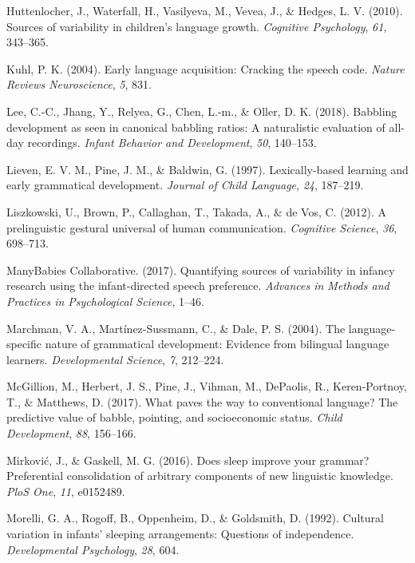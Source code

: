 \documentclass[,man,floatsintext]{apa6}
\begin{document}
\hypertarget{ref-huttenlocher2010sources}{}
Huttenlocher, J., Waterfall, H., Vasilyeva, M., Vevea, J., \& Hedges, L.
V. (2010). Sources of variability in children's language growth.
\emph{Cognitive Psychology}, \emph{61}, 343--365.

\hypertarget{ref-kuhl2004early}{}
Kuhl, P. K. (2004). Early language acquisition: Cracking the speech
code. \emph{Nature Reviews Neuroscience}, \emph{5}, 831.

\hypertarget{ref-lee2018babbling}{}
Lee, C.-C., Jhang, Y., Relyea, G., Chen, L.-m., \& Oller, D. K. (2018).
Babbling development as seen in canonical babbling ratios: A
naturalistic evaluation of all-day recordings. \emph{Infant Behavior and
Development}, \emph{50}, 140--153.

\hypertarget{ref-lieven1997lexically}{}
Lieven, E. V. M., Pine, J. M., \& Baldwin, G. (1997). Lexically-based
learning and early grammatical development. \emph{Journal of Child
Language}, \emph{24}, 187--219.

\hypertarget{ref-liszkowski2012prelinguistic}{}
Liszkowski, U., Brown, P., Callaghan, T., Takada, A., \& de Vos, C.
(2012). A prelinguistic gestural universal of human communication.
\emph{Cognitive Science}, \emph{36}, 698--713.

\hypertarget{ref-manybabies2017}{}
ManyBabies Collaborative. (2017). Quantifying sources of variability in
infancy research using the infant-directed speech preference.
\emph{Advances in Methods and Practices in Psychological Science},
1--46.

\hypertarget{ref-marchman2004language}{}
Marchman, V. A., Martínez-Sussmann, C., \& Dale, P. S. (2004). The
language-specific nature of grammatical development: Evidence from
bilingual language learners. \emph{Developmental Science}, \emph{7},
212--224.

\hypertarget{ref-mcgillion2017paves}{}
McGillion, M., Herbert, J. S., Pine, J., Vihman, M., DePaolis, R.,
Keren-Portnoy, T., \& Matthews, D. (2017). What paves the way to
conventional language? The predictive value of babble, pointing, and
socioeconomic status. \emph{Child Development}, \emph{88}, 156--166.

\hypertarget{ref-mirkovic2016does}{}
Mirković, J., \& Gaskell, M. G. (2016). Does sleep improve your grammar?
Preferential consolidation of arbitrary components of new linguistic
knowledge. \emph{PloS One}, \emph{11}, e0152489.

\hypertarget{ref-morelli1992cultural}{}
Morelli, G. A., Rogoff, B., Oppenheim, D., \& Goldsmith, D. (1992).
Cultural variation in infants' sleeping arrangements: Questions of
independence. \emph{Developmental Psychology}, \emph{28}, 604.
\end{document}
